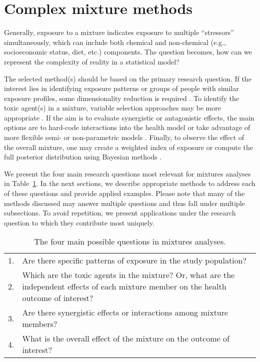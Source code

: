\section{Complex mixture methods}\label{sec:Methods}

Generally, exposure to a mixture indicates exposure to multiple ``stressors'' simultaneously, which can include both chemical and non-chemical (e.g., socioeconomic status, diet, etc.) components. The question becomes, how can we represent the complexity of reality in a statistical model? 

The selected method(s) should be based on the primary research question. If the interest lies in identifying exposure patterns or groups of people with similar exposure profiles, some dimensionality reduction is required \citep{jolliffe02, jolliffe02b, thompson04, paatero94}. To identify the toxic agent(s) in a mixture, variable selection approaches may be more appropriate \citep{tibshirani96, zou05}. If the aim is to evaluate synergistic or antagonistic effects, the main options are to hard-code interactions into the health model or take advantage of more flexible semi- or non-parametric models \citep{bobb2014bayesian,coull2015,bobb2018statistical}. Finally, to observe the effect of the overall mixture, one may create a weighted index of exposure or compute the full posterior distribution using Bayesian methods \citep{carrico15,bobb2014bayesian,coull2015}.

We present the four main research questions most relevant for mixtures analyses in Table~\ref{tab:qx}. In the next sections, we describe appropriate methods to address each of these questions and provide applied examples. Please note that many of the methods discussed may answer multiple questions and thus fall under multiple subsections. To avoid repetition, we present applications under the research question to which they contribute most uniquely. \\

\begin{table}[ht]
\begin{center}
\caption{The four main possible questions in mixtures analyses.}
\label{tab:qx}
\begin{tabular}{|c p{15cm}|}
\hline
  1. & Are there specific patterns of exposure in the study population? \\
  2. & Which are the toxic agents in the mixture? Or, what are the independent effects of each mixture member on the health outcome of interest? \\
  3. & Are there synergistic effects or interactions among mixture members? \\
  4. & What is the overall effect of the mixture on the outcome of interest? \\
\hline
\end{tabular}
\end{center}
\end{table}
\vspace{-2em}

